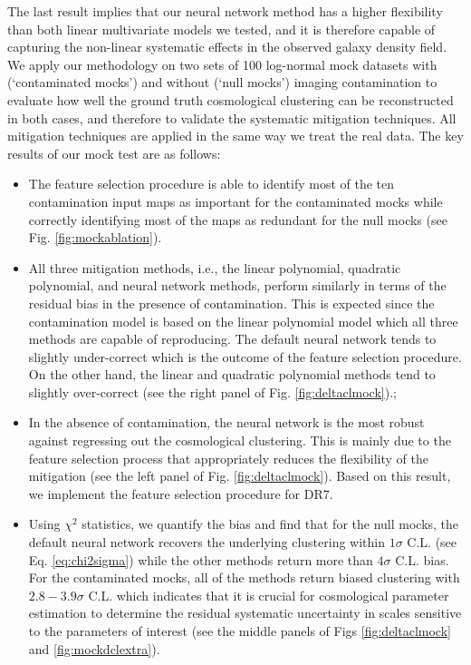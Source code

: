 The last result implies that our neural network method has a higher flexibility than both linear multivariate models we tested, and it is therefore capable of capturing the non-linear systematic effects in the observed galaxy density field.\\

We apply our methodology on two sets of 100 log-normal mock datasets with (`contaminated mocks') and without (`null mocks') imaging contamination to evaluate how well the ground truth cosmological clustering can be reconstructed in both cases, and therefore to validate the systematic mitigation techniques. All mitigation techniques are applied in the same way we treat the real data. The key results of our mock test are as follows:\\

\begin{itemize}
    \item The feature selection procedure is able to identify most of the ten contamination input maps as important for the contaminated mocks while correctly identifying most of the maps as redundant for the null mocks (see Fig. \ref{fig:mockablation}).
    
    \item All three mitigation methods, i.e., the linear polynomial, quadratic polynomial, and neural network methods, perform similarly in terms of the residual bias in the presence of contamination. This is expected since the contamination model is based on the linear polynomial model which all three methods are capable of reproducing. The default neural network tends to slightly under-correct which is the outcome of the feature selection procedure. On the other hand, the linear and quadratic polynomial methods tend to slightly over-correct (see the right panel of Fig. \ref{fig:deltaclmock}).;
    
    \item In the absence of contamination, the neural network is the most robust against regressing out the cosmological clustering. This is mainly due to the feature selection process that appropriately reduces the flexibility of the mitigation (see the left panel of Fig. \ref{fig:deltaclmock}). Based on this result, we implement the feature selection procedure for DR7.
    
    \item Using $\chi^{2}$ statistics, we quantify the bias and find that for the null mocks, the default neural network recovers the underlying clustering within $1\sigma$ C.L. (see Eq. \ref{eq:chi2sigma}) while the other methods return more than $4\sigma$ C.L. bias. For the contaminated mocks, all of the methods return biased clustering with $2.8-3.9\sigma$ C.L. which indicates that it is crucial for cosmological parameter estimation to determine the residual systematic uncertainty in scales sensitive to the parameters of interest (see the middle panels of Figs \ref{fig:deltaclmock} and \ref{fig:mockdclextra}).
    

\end{itemize}
